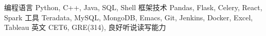 \documentclass[11pt, a4paper, UTF8]{awesome-cv}
\begin{document}
%
\begin{cvskills}
  \cvskill
    {编程语言} %
    {Python, C++, Java, SQL, Shell} %
  \cvskill
    {框架技术} %
    {Pandas, Flask, Celery, React, Spark} %
  \cvskill
    {工具} %
    {Teradata, MySQL, MongoDB, Emacs, Git, Jenkins, Docker, Excel, Tableau} %
  \cvskill
    {英文} %
    {CET6, GRE(314), 良好听说读写能力} %
\end{cvskills}



%
%
%
%
%


\end{document}
